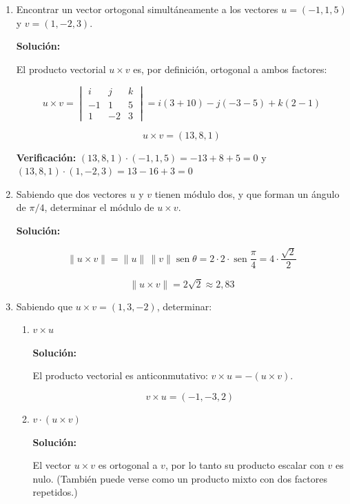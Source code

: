 \documentclass[12pt]{article}
\newcommand{\solucion}{%
    \vspace{0.8em}%
    \textbf{Solución:}%
    \vspace{0.8em}%
}
\begin{document}
\begin{enumerate}[label=\alph*.-]

    \item Encontrar un vector ortogonal simultáneamente a los vectores
    $u=(-1,1,5)$ y $v=(1,-2,3)$.

    \solucion

    El producto vectorial $u\times v$ es, por definición, ortogonal a ambos
    factores:

    \[
    u\times v=\begin{vmatrix}
    i & j & k\\
    -1 & 1 & 5\\
    1 & -2 & 3
    \end{vmatrix}
    =i(3+10)-j(-3-5)+k(2-1)
    \]

    \[
    \boxed{u\times v=(13,8,1)}
    \]

    \textbf{Verificación:}
    $(13,8,1)\cdot(-1,1,5)=-13+8+5=0$ \checkmark \quad y \quad
    $(13,8,1)\cdot(1,-2,3)=13-16+3=0$ \checkmark

    \item Sabiendo que dos vectores $u$ y $v$ tienen módulo dos, y que forman
    un ángulo de $\pi/4$, determinar el módulo de $u\times v$.

    \solucion

    \[
    \|u\times v\|=\|u\|\,\|v\|\operatorname{sen}\theta
    =2\cdot2\cdot\operatorname{sen}\frac{\pi}{4}
    =4\cdot\frac{\sqrt{2}}{2}
    \]

    \[
    \boxed{\|u\times v\|=2\sqrt{2}\approx2{,}83}
    \]

    \item Sabiendo que $u\times v=(1,3,-2)$, determinar:

    \begin{enumerate}[label=\roman*)]

        \item $v\times u$

        \solucion

        El producto vectorial es anticonmutativo: $v\times u=-(u\times v)$.

        \[
        \boxed{v\times u=(-1,-3,2)}
        \]

        \item $v\cdot(u\times v)$

        \solucion

        El vector $u\times v$ es ortogonal a $v$, por lo tanto su producto
        escalar con $v$ es nulo. (También puede verse como un producto mixto
        con dos factores repetidos.)


\end{enumerate}
\end{enumerate}
\end{document}

